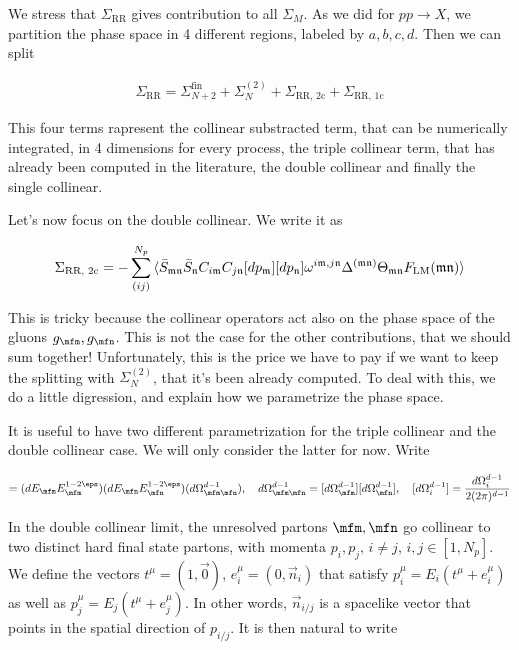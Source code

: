 \documentclass[11pt]{report}
\begin{document}
We stress that \(\Sigma_{\text{RR}}\) gives contribution to all \(\Sigma_{M}\). As we did for \(pp \to X\), we partition the phase space in 4 different regions, labeled by \(a, b, c, d\). Then we can split 

\begin{align}
    \Sigma_{\text{RR}} = \Sigma^{\text{fin}}_{N+2} + \Sigma^{(2)}_N + \Sigma_{\text{RR, 2c}} + \Sigma_{\text{RR, 1c}}
\end{align}

This four terms rapresent the collinear substracted term, that can be numerically integrated, in 4 dimensions for every process, the triple collinear term, that has already been computed in the literature, the double collinear and finally the single collinear. 

Let's now focus on the double collinear. We write it as 

\begin{align}
    \Sigma_{\text{RR, 2c}} = -\sum_{(ij)}^{N_p} \braket{\bar{S}_{\mathfrak{mn}}\bar{S}_{\mathfrak{n}}C_{i\mathfrak{m}}C_{j\mathfrak{n}}[dp_{\mathfrak{m}}][dp_{\mathfrak{n}}]\omega^{i\mathfrak{m}, j\mathfrak{n}}\Delta^{(\mathfrak{mn})}\Theta_{\mathfrak{mn}}F_{\text{LM}}(\mathfrak{mn})}
\end{align}

This is tricky because the collinear operators act also on the phase space of the gluons \(g_\mfm , g_\mfn\). This is not the case for the other contributions, that we should sum together! Unfortunately, this is the price we have to pay if we want to keep the splitting with \(\Sigma^{(2)}_N\), that it's been already computed. To deal with this, we do a little digression, and explain how we parametrize the phase space. 

It is useful to have two different parametrization for the triple collinear and the double collinear case. We will only consider the latter for now. Write 

\begin{align}
    [dp_\mfm][dp_\mfn] = (dE_\mfm E_\mfm ^{1-2\eps})(dE_\mfn E_\mfn ^{1-2\eps})(d\Omega_{\mfm\mfn}^{d-1}), \quad d\Omega_{\mfm\mfn}^{d-1} = [d\Omega_{\mfm}^{d-1}][d\Omega_{\mfn}^{d-1}], \quad [d\Omega_i^{d-1}] = \frac{d\Omega_i^{d-1}}{2(2\pi)^{d-1}} 
\end{align}

In the double collinear limit, the unresolved partons \(\mfm, \mfn\) go collinear to two distinct hard final state partons, with momenta \(p_i, p_j, \, i \neq j, \, i, j \in [1, N_p]\). We define the vectors \(t^\mu = (1, \vec{0})\), \(e^\mu_i = (0, \vec{n}_i)\) that satisfy \(p^\mu_i = E_i (t^\mu + e^\mu_i)\) as well as \(p^\mu_j = E_j (t^\mu + e^\mu_j)\). In other words, \(\vec{n}_{i/j}\) is a spacelike vector that points in the spatial direction of \(p_{i/j}\). It is then natural to write 
\end{document}
